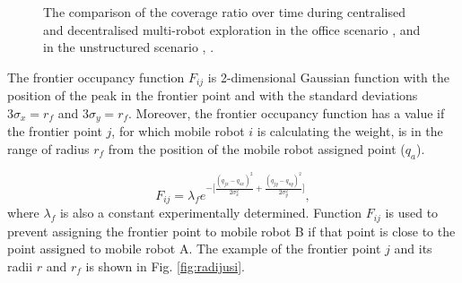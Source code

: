 \documentclass[letterpaper, 10 pt, conference]{ieeeconf}  %
\begin{document}
\begin{figure}[h!]
\begin{center}
{        }\hfill
%
    \end{center}
    \caption{%
        The comparison of the coverage ratio over time during centralised and decentralised multi-robot exploration in the office scenario ,  and in the unstructured scenario , . 
     }%
   \label{fig:coverage_subfigures}
\end{figure}


The frontier occupancy function $F_{ij}$ is 2-dimensional Gaussian function with the position of the peak in the frontier point and with the standard deviations $3\sigma_{x}=r_{f}$ and $3\sigma_{y}=r_{f}$. Moreover, the frontier occupancy function has a value if the frontier point $j$, for which mobile robot $i$ is calculating the weight, is in the range of radius $r_{f}$ from the position of the mobile robot assigned point ($q_{a}$). 

\begin{equation}
    F_{ij} =  \lambda_{f} e^{-\Big[\frac{(q_{jx} - q_{ax})^2}{2\sigma_{x}^2} + \frac{(q_{jy} - q_{ay})^2}{2\sigma_{y}^2}\Big]},
\end{equation}
where $\lambda_{f}$  is also  a constant experimentally determined. Function $F_{ij}$ is used to prevent assigning the frontier point to mobile robot B if that point is close to the point assigned to mobile robot A. The example of the frontier point $j$ and its radii $r$ and $r_{f}$ is shown in Fig. \ref{fig:radijusi}.
\end{document}
